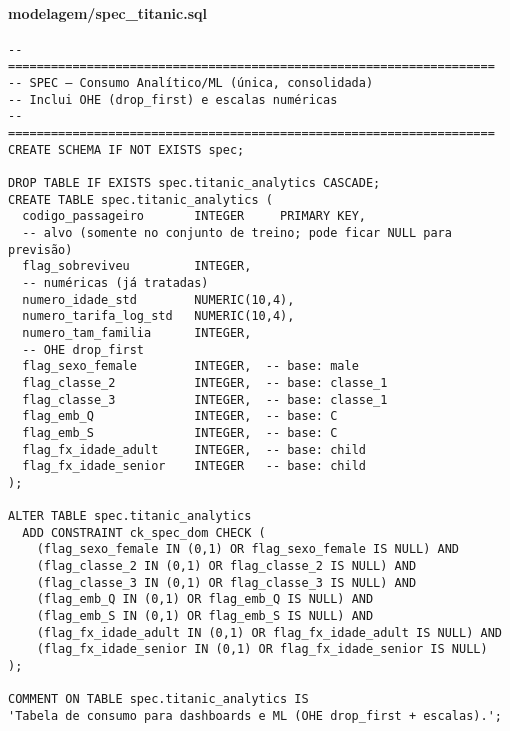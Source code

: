 \documentclass[12pt,a4paper]{article}
\begin{document}
\paragraph{modelagem/spec\_titanic.sql}
\begin{verbatim}
-- ====================================================================
-- SPEC — Consumo Analítico/ML (única, consolidada)
-- Inclui OHE (drop_first) e escalas numéricas
-- ====================================================================
CREATE SCHEMA IF NOT EXISTS spec;

DROP TABLE IF EXISTS spec.titanic_analytics CASCADE;
CREATE TABLE spec.titanic_analytics (
  codigo_passageiro       INTEGER     PRIMARY KEY,
  -- alvo (somente no conjunto de treino; pode ficar NULL para previsão)
  flag_sobreviveu         INTEGER,
  -- numéricas (já tratadas)
  numero_idade_std        NUMERIC(10,4),
  numero_tarifa_log_std   NUMERIC(10,4),
  numero_tam_familia      INTEGER,
  -- OHE drop_first
  flag_sexo_female        INTEGER,  -- base: male
  flag_classe_2           INTEGER,  -- base: classe_1
  flag_classe_3           INTEGER,  -- base: classe_1
  flag_emb_Q              INTEGER,  -- base: C
  flag_emb_S              INTEGER,  -- base: C
  flag_fx_idade_adult     INTEGER,  -- base: child
  flag_fx_idade_senior    INTEGER   -- base: child
);

ALTER TABLE spec.titanic_analytics
  ADD CONSTRAINT ck_spec_dom CHECK (
    (flag_sexo_female IN (0,1) OR flag_sexo_female IS NULL) AND
    (flag_classe_2 IN (0,1) OR flag_classe_2 IS NULL) AND
    (flag_classe_3 IN (0,1) OR flag_classe_3 IS NULL) AND
    (flag_emb_Q IN (0,1) OR flag_emb_Q IS NULL) AND
    (flag_emb_S IN (0,1) OR flag_emb_S IS NULL) AND
    (flag_fx_idade_adult IN (0,1) OR flag_fx_idade_adult IS NULL) AND
    (flag_fx_idade_senior IN (0,1) OR flag_fx_idade_senior IS NULL)
);

COMMENT ON TABLE spec.titanic_analytics IS
'Tabela de consumo para dashboards e ML (OHE drop_first + escalas).';


\end{verbatim}
\end{document}
